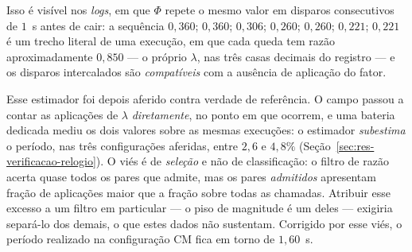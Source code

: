 Isso é visível nos \textit{logs},
em que $\Phi$ repete o mesmo valor em disparos consecutivos de $1$~s antes de cair: a
sequência $0{,}360$; $0{,}360$; $0{,}306$; $0{,}260$; $0{,}260$; $0{,}221$; $0{,}221$ é
um trecho literal de uma execução, em que cada queda tem razão aproximadamente
$0{,}850$ --- o próprio $\lambda$, nas três casas decimais do registro --- e os
disparos intercalados são \emph{compatíveis} com a ausência de aplicação do fator.

Esse estimador foi depois aferido contra verdade de referência. O campo passou a contar
as aplicações de $\lambda$ \emph{diretamente}, no ponto em que ocorrem, e uma bateria
dedicada mediu os dois valores sobre as mesmas execuções: o estimador
\emph{subestima} o período, nas três configurações aferidas, entre $2{,}6$ e $4{,}8\%$
(Seção~\ref{sec:res-verificacao-relogio}). O viés é de \emph{seleção} e não de
classificação: o filtro de razão acerta quase todos os pares que admite, mas os pares
\emph{admitidos} apresentam fração de aplicações maior que a fração sobre todas as
chamadas. Atribuir esse excesso a um filtro em particular --- o piso de magnitude é um
deles --- exigiria separá-lo dos demais, o que estes dados não sustentam.
Corrigido por esse viés, o período realizado na configuração CM fica em torno de
$1{,}60$~s.

